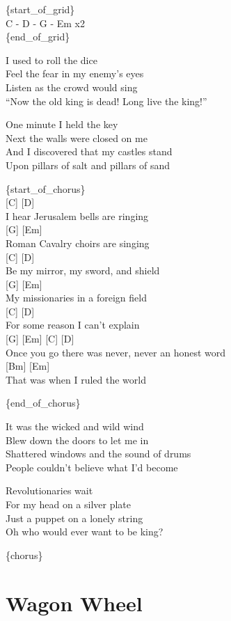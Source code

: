 \documentclass[
  letterpaper,
  DIV=11,
  numbers=noendperiod]{scrreprt}
\begin{document}
\{start\_of\_grid\}\\
C - D - G - Em x2\\
\{end\_of\_grid\}

I used to roll the dice\\
Feel the fear in my enemy's eyes\\
Listen as the crowd would sing\\
``Now the old king is dead! Long live the king!''

One minute I held the key\\
Next the walls were closed on me\\
And I discovered that my castles stand\\
Upon pillars of salt and pillars of sand

\{start\_of\_chorus\}\\
{[}C{]} {[}D{]}\\
I hear Jerusalem bells are ringing\\
{[}G{]} {[}Em{]}\\
Roman Cavalry choirs are singing\\
{[}C{]} {[}D{]}\\
Be my mirror, my sword, and shield\\
{[}G{]} {[}Em{]}\\
My missionaries in a foreign field\\
{[}C{]} {[}D{]}\\
For some reason I can't explain\\
{[}G{]} {[}Em{]} {[}C{]} {[}D{]}\\
Once you go there was never, never an honest word\\
{[}Bm{]} {[}Em{]}\\
That was when I ruled the world

\{end\_of\_chorus\}

It was the wicked and wild wind\\
Blew down the doors to let me in\\
Shattered windows and the sound of drums\\
People couldn't believe what I'd become

Revolutionaries wait\\
For my head on a silver plate\\
Just a puppet on a lonely string\\
Oh who would ever want to be king?

\{chorus\}

\hypertarget{wagon-wheel}{%
\chapter{Wagon Wheel}\label{wagon-wheel}}
\end{document}
